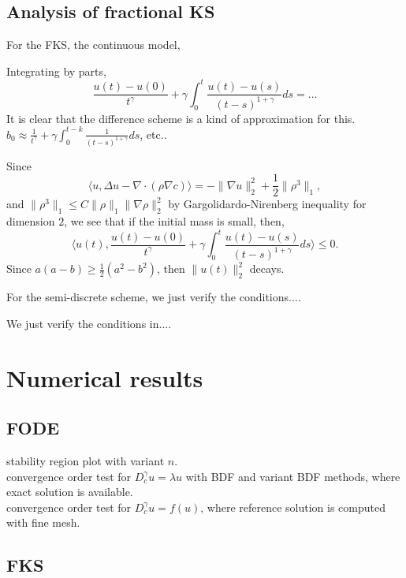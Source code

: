 \documentclass[11pt]{article} %
\begin{document}
\subsection{Analysis of fractional KS}

For the FKS, the continuous model,

Integrating by parts, $$
\frac{u(t)-u(0)}{t^{\gamma}}+\gamma\int_0^t\frac{u(t)-u(s)}{(t-s)^{1+\gamma}}ds
=\ldots
$$
It is clear that the difference scheme is a kind of approximation for this.
$b_0\approx \frac{1}{t^{\gamma}}+\gamma\int_0^{t-k}\frac{1}{(t-s)^{1+\gamma}}ds$, etc..

Since $$
\langle u, \Delta u-\nabla\cdot(\rho\nabla c)\rangle
=-\|\nabla u\|_2^2+\frac{1}{2}\|\rho^3\|_1,
$$
and $\|\rho^3\|_1\le C\|\rho\|_1\|\nabla\rho\|_2^2$ by Gargolidardo-Nirenberg inequality for dimension $2$, we see that if the initial mass is small, then, 
 $$
\langle u(t), \frac{u(t)-u(0)}{t^{\gamma}}+\gamma\int_0^t\frac{u(t)-u(s)}{(t-s)^{1+\gamma}}ds\rangle\le 0. 
$$
Since $a(a-b)\ge \frac{1}{2}(a^2-b^2)$, then $\|u(t)\|_2^2$ decays.


For the semi-discrete scheme, we just verify the conditions....



We just verify the conditions in....

\section{Numerical results}
\subsection{FODE}
stability region plot with variant $n$. \\

convergence order test for $D^\gamma_c u = \lambda u$ with BDF and variant BDF methods, where exact solution is available. \\


convergence order test for $D^\gamma_c u = f( u)$, where reference solution is computed with fine mesh.

\subsection{FKS}



\appendix
\end{document}
